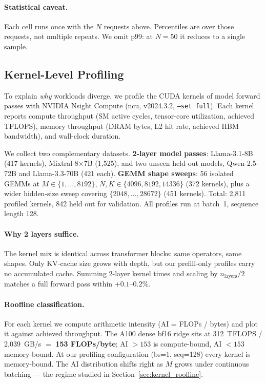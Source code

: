 \paragraph{Statistical caveat.} Each cell runs once with the $N$ requests above. Percentiles are over those requests, not multiple repeats. We omit p99: at $N{=}50$ it reduces to a single sample.

\subsection{Kernel-Level Profiling}
\label{sec:ncu_method}

To explain \emph{why} workloads diverge, we profile the CUDA kernels of model forward passes with NVIDIA Nsight Compute (ncu, v2024.3.2, \texttt{--set full}). Each kernel reports compute throughput (SM active cycles, tensor-core utilization, achieved TFLOPS), memory throughput (DRAM bytes, L2 hit rate, achieved HBM bandwidth), and wall-clock duration.

We collect two complementary datasets. \textbf{2-layer model passes}: Llama-3.1-8B (417 kernels), Mixtral-8$\times$7B (1{,}525), and two unseen held-out models, Qwen-2.5-72B and Llama-3.3-70B (421 each). \textbf{GEMM shape sweeps}: 56 isolated GEMMs at $M \in \{1,\ldots,8192\}$, $N,K \in \{4096,8192,14336\}$ (372 kernels), plus a wider hidden-size sweep covering $\{2048,\ldots,28672\}$ (451 kernels). Total: 2{,}811 profiled kernels, 842 held out for validation. All profiles run at batch~1, sequence length 128.

\paragraph{Why 2 layers suffice.} The kernel mix is identical across transformer blocks: same operators, same shapes. Only KV-cache size grows with depth, but our prefill-only profiles carry no accumulated cache. Summing 2-layer kernel times and scaling by $n_\text{layers}/2$ matches a full forward pass within $+0.1$--$0.2\%$.

\paragraph{Roofline classification.} For each kernel we compute arithmetic intensity (AI = FLOPs / bytes) and plot it against achieved throughput. The A100 dense bf16 ridge sits at 312~TFLOPS / 2{,}039~GB/s $=$ \textbf{153 FLOPs/byte}; AI $> 153$ is compute-bound, AI $< 153$ memory-bound. At our profiling configuration (bs=1, seq=128) every kernel is memory-bound. The AI distribution shifts right as $M$ grows under continuous batching --- the regime studied in Section~\ref{sec:kernel_roofline}.

